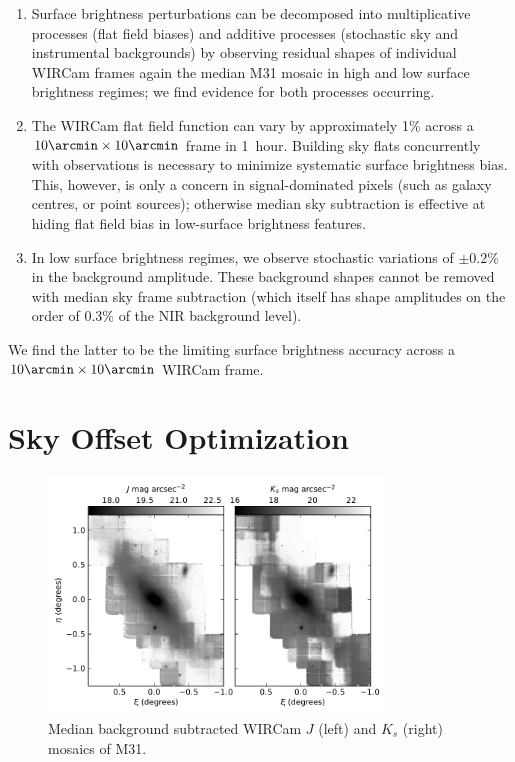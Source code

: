 \documentclass[iop]{emulateapj}
\begin{document}
\begin{enumerate}
\item Surface brightness perturbations can be decomposed into multiplicative processes (flat field biases) and additive processes (stochastic sky and instrumental backgrounds) by observing residual shapes of individual WIRCam frames again the median M31 mosaic in high and low surface brightness regimes; we find evidence for both processes occurring.
\item The WIRCam flat field function can vary by approximately 1\% across a $10\arcmin \times 10\arcmin$ frame in 1~hour.
Building sky flats concurrently with observations is necessary to minimize systematic surface brightness bias.
This, however, is only a concern in signal-dominated pixels (such as galaxy centres, or point sources); otherwise median sky subtraction is effective at hiding flat field bias in low-surface brightness features.
\item In low surface brightness regimes, we observe stochastic variations of $\pm 0.2$\% in the background amplitude.
These background shapes cannot be removed with median sky frame subtraction (which itself has shape amplitudes on the order of $0.3\%$ of the NIR background level).
\end{enumerate}

We find the latter to be the limiting surface brightness accuracy across a $10\arcmin \times 10\arcmin$ WIRCam frame.

\section{Sky Offset Optimization}
\label{sec:scalar}

\begin{figure}[t]
\centering
\includegraphics[width=3.5in]{figs/raw_mosaics}
\caption{Median background subtracted WIRCam $J$ (left) and $K_s$ (right) mosaics of M31.}
\label{fig:raw_mosaics}
\end{figure}
\end{document}
